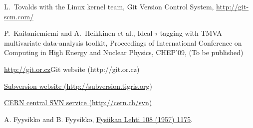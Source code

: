 \documentclass[12pt]{article}
\begin{document}
\begin{thebibliography}{9}
L.~Tovalds with the Linux kernel team,
Git Version Control System,
\href{http://git-scm.com/}{http://git-scm.com/}

P.~Kaitaniemiemi and A.~Heikkinen et al.,
Ideal $\tau$-tagging with TMVA multivariate data-analysis toolkit,
Proceedings of International Conference on 
Computing in High Energy and Nuclear Physics, CHEP'09,
(To be published)


\url{http://git.or.cz}{Git website (http://git.or.cz)}

\href{http://subversion.tigris.org}{Subversion website (http://subversion.tigris.org)}

\href{http://cern.ch/svn}{CERN central SVN service (http://cern.ch/svn)}

A. Fyysikko and B. Fyysikko,
\href{http://link.aps.org/abstract/PR/v108/p1175}{Fysiikan Lehti 108
(1957) 1175}.

\end{thebibliography}
\end{document}

